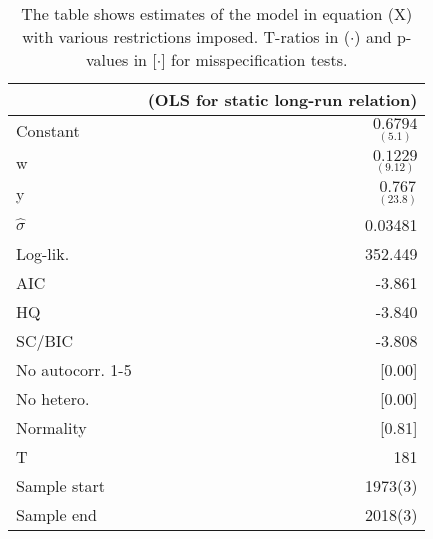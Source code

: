 
\begin{table}[tbph]
\begin{center}
\begin{tabular}{lr}
\hline
& (OLS for static long-run relation) \\
\hline
Constant & $\underset{(5.1)}{0.6794}$ \\
w & $\underset{(9.12)}{0.1229}$ \\
y & $\underset{(23.8)}{0.767}$ \\
\hline
$\hat{\sigma}$ & 0.03481 \\
Log-lik. & 352.449 \\
\hline
AIC & -3.861 \\
HQ & -3.840 \\
SC/BIC & -3.808 \\
\hline
No autocorr. 1-5 & [0.00] \\
No hetero. & [0.00] \\
Normality & [0.81] \\
\hline
T & 181 \\
Sample start & 1973(3) \\
Sample end & 2018(3) \\
\hline
\end{tabular}
\end{center}
\vspace{1em}
\caption{The table shows estimates of the model in equation (X) with various restrictions imposed. T-ratios in ($\cdot$) and p-values in [$\cdot$] for misspecification tests.}
\end{table}